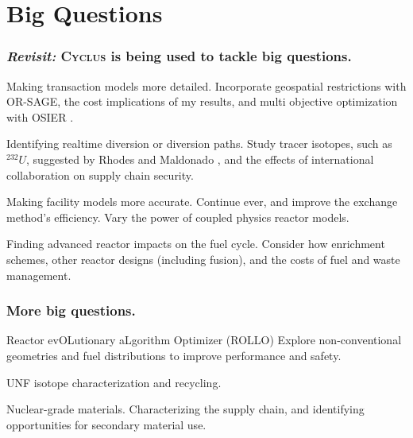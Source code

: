 \documentclass[9pt]{beamer}
\newcommand{\cyclus}{\textsc{Cyclus}\xspace}
\begin{document}
  \section{Big Questions}
  \begin{frame}
    \frametitle{\textit{Revisit:} \cyclus is being used to tackle big questions.}
    \begin{block}{Making transaction models more detailed.}
        Incorporate geospatial restrictions with OR-SAGE, the cost implications of my results, and multi objective optimization with OSIER \cite{Dotson_osier}.
    \end{block} \pause
    \begin{block}{Identifying realtime diversion or diversion paths.}
        Study tracer isotopes, such as $^{232}U$, suggested by Rhodes and Maldonado \cite{rhodes_u232}, and the effects of international collaboration on supply chain security.
    \end{block} \pause
    \begin{block}{Making facility models more accurate.}
      Continue \gls{ever}, and improve the exchange method's efficiency. Vary the power of coupled physics reactor models.
    \end{block}\pause
    \begin{block}{Finding advanced reactor impacts on the fuel cycle.}
      Consider how enrichment schemes, other reactor designs (including fusion), and the costs of fuel and waste management.
    \end{block}
  \end{frame}

  \begin{frame}
    \frametitle{More big questions.} %
    \begin{block}{Reactor evOLutionary aLgorithm Optimizer (ROLLO)}
      Explore non-conventional geometries and fuel distributions to improve performance and safety.
    \end{block} \pause
    \begin{block}{UNF isotope characterization and recycling.}

    \end{block} \pause
    \begin{block}{Nuclear-grade materials.}
      Characterizing the supply chain, and identifying opportunities for secondary material use.
    \end{block}
  \end{frame}
\end{document}
